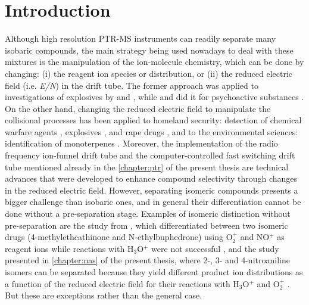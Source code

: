 \section{Introduction}
Although high resolution PTR-MS instruments can readily separate many isobaric compounds, the main strategy being used  nowadays to deal with these mixtures is the manipulation of the ion-molecule chemistry, which can be done by changing: (i) the reagent ion species or distribution, or (ii) the reduced electric field (i.e. \textit{E/N}) in the drift tube. The former approach was applied to investigations of explosives by \citeauthor{sulzer2013applications} and \citeauthor{agarwal2014sensitivity}   \cite{sulzer2013applications,agarwal2014sensitivity}, while \citeauthor{lanza2015selective} and \citeauthor{acton2014headspace} did it for psychoactive substances \cite{lanza2015selective,acton2014headspace}.
On the other hand, changing  the reduced electric field to manipulate the collisional processes  has been applied to homeland security: detection of chemical warfare agents \cite{petersson2009real}, explosives \cite{mayhew2010applications,sulzer2012proton,sulzer2013applications}, and rape drugs \cite{doi:10.1002/jms.2993}, and to the environmental sciences: identification of monoterpenes \cite{materic2017selective}. 
Moreover, the implementation of the radio frequency ion-funnel drift tube  \cite{RF_TNT} and the computer-controlled fast switching drift tube  \cite{doi:10.1021/acs.analchem.7b05211} mentioned already in the  \autoref{chapter:ptr} of the present thesis are technical advances that were developed to enhance compound selectivity through changes in the reduced electric field. 
However, separating isomeric compounds presents a bigger challenge than isobaric ones, and in general their differentiation cannot be done without a pre-separation stage. Examples of isomeric distinction without pre-separation are the study from  \citeauthor{lanza2013distinguishing}, which differentiated between two isomeric drugs (4-methylethcathinone and N-ethylbuphedrone) using O$_2^+$ and NO$^+$ as reagent ions while reactions with H$_3$O$^+$ were not successful \cite{lanza2013distinguishing}, and the study %
presented in \autoref{chapter:nas} of the present thesis, where 2-, 3- and 4-nitroaniline isomers can be separated because they yield different product ion distributions as a function of the reduced electric field for their reactions with H$_ 3$O$^+$ and O$_2^+$ \cite{nitroanilinespaperreference}. But these are exceptions rather than the general case.




